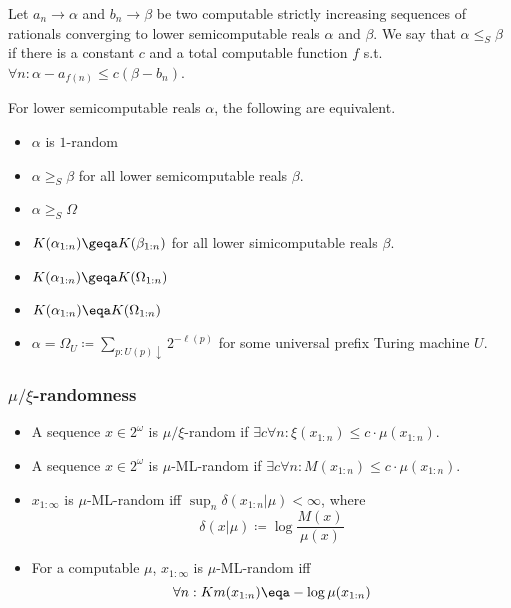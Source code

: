 \documentclass[UTF8,11pt,colorlinks,compress,openany]{beamer}%
\begin{document}
\begin{frame}\frametitle{}
\begin{definition}
Let $a_n\to\alpha$ and $b_n\to\beta$ be two computable strictly increasing sequences of rationals converging to lower semicomputable reals $\alpha$ and $\beta$. We say that $\alpha\leq_S\beta$ if there is a constant $c$ and a total computable function $f$ s.t. $\forall n:\alpha-a_{f(n)}\leq c(\beta-b_n)$.
\end{definition}
\begin{theorem}
For lower semicomputable reals $\alpha$, the following are equivalent.
\begin{itemize}
	\item $\alpha$ is $1$-random
	\item $\alpha\geq_S\beta$ for all lower semicomputable reals $\beta$.
	\item $\alpha\geq_S\Omega$
	\item $K(\alpha_{1:n})\geqa K(\beta_{1:n})$ for all lower simicomputable reals $\beta$.
	\item $K(\alpha_{1:n})\geqa K(\Omega_{1:n})$
	\item $K(\alpha_{1:n})\eqa K(\Omega_{1:n})$
	\item $\alpha=\Omega_U\coloneqq \sum\limits_{p:U(p)\downarrow}2^{-\ell(p)}$ for some universal prefix Turing machine $U$.
\end{itemize}
\end{theorem}
\end{frame}

\begin{frame}\frametitle{$\mu/\xi$-randomness}
\begin{definition}[$\mu/\xi$-randomness]
\begin{itemize}
	\item A sequence $x\in 2^\omega$ is $\mu/\xi$-random if $\exists c\forall n: \xi(x_{1:n})\leq c\cdot\mu(x_{1:n})$.
	\item A sequence $x\in 2^\omega$ is $\mu$-ML-random if $\exists c\forall n: M(x_{1:n})\leq c\cdot\mu(x_{1:n})$.
\end{itemize}
\end{definition}
\begin{itemize}
\item $x_{1:\infty}$ is $\mu$-ML-random iff $\sup_n\delta(x_{1:n}|\mu)<\infty$, where
\[\delta(x|\mu)\coloneqq \log\frac{M(x)}{\mu(x)}\]
\item For a computable $\mu$, $x_{1:\infty}$ is $\mu$-ML-random iff
\[\forall n: Km(x_{1:n})\eqa-\log\mu(x_{1:n})\]
\end{itemize}
\end{frame}
\end{document}
